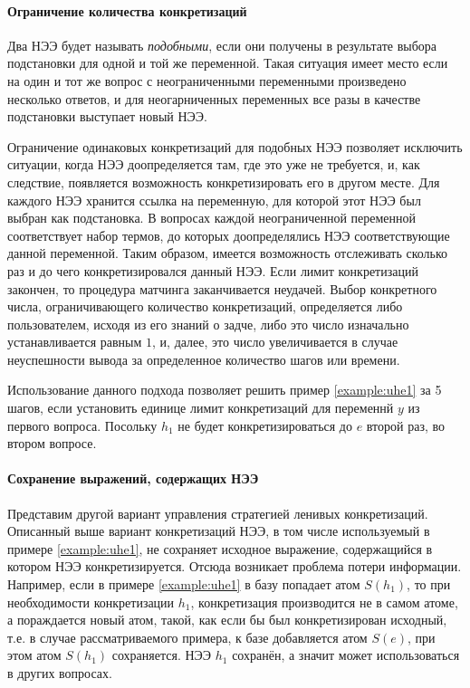 \paragraph{Ограничение количества конкретизаций}
Два НЭЭ будет называть \emph{подобными}, если они получены в результате выбора подстановки для одной и той же переменной. Такая ситуация имеет место если на один и тот же вопрос с неограниченными переменными произведено несколько ответов, и для неогарниченных переменных все разы в качестве подстановки выступает новый НЭЭ.

Ограничение одинаковых конкретизаций для подобных НЭЭ позволяет исключить ситуации, когда НЭЭ доопределяется там, где это уже не требуется, и, как следствие, появляется возможность конкретизировать его в другом месте. Для каждого НЭЭ хранится ссылка на переменную, для которой этот НЭЭ был выбран как подстановка. В вопросах каждой неограниченной переменной соответствует набор термов, до которых доопределялись НЭЭ соответствующие данной переменной. Таким образом, имеется возможность отслеживать сколько раз и до чего конкретизировался данный НЭЭ. Если лимит конкретизаций закончен, то процедура матчинга заканчивается неудачей. Выбор конкретного числа, ограничивающего количество конкретизаций, определяется либо пользователем, исходя из его знаний о задче, либо это число изначально устанавливается равным $1$, и, далее, это число увеличивается в случае неуспешности вывода за определенное количество шагов или времени.

Использование данного подхода позволяет решить пример \ref{example:uhe1} за 5 шагов, если установить единице лимит конкретизаций для переменнй $y$ из первого вопроса. Посольку $h_1$ не будет конкретизироваться до $e$ второй раз, во втором вопросе.

\paragraph{Сохранение выражений, содержащих НЭЭ}
Представим другой вариант управления стратегией ленивых конкретизаций. Описанный выше вариант конкретизаций НЭЭ, в том числе используемый в примере \ref{example:uhe1}, не сохраняет исходное выражение, содержащийся в котором НЭЭ конкретизируется. Отсюда возникает проблема потери информации. Например, если в примере \ref{example:uhe1} в базу попадает атом $S(h_1)$, то при необходимости конкретизации $h_1$, конкретизация производится не в самом атоме, а пораждается новый атом, такой, как если бы был конкретизирован исходный, т.е. в случае рассматриваемого примера, к базе добавляется атом $S(e)$, при этом атом $S(h_1)$ сохраняется. НЭЭ $h_1$ сохранён, а значит может использоваться в других вопросах.

